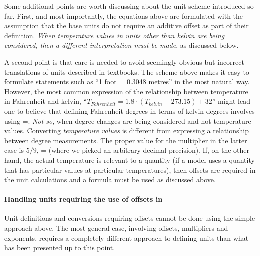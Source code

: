 Some additional points are worth discussing about the unit scheme
introduced so far.  First, and most importantly, the equations
above are formulated with the assumption that the base units do
not require an additive offset as part of their definition.
\emph{When temperature values in units other than kelvin are being
  considered, then a different interpretation must be made}, as
discussed below.

A second point is that care is needed to avoid seemingly-obvious
but incorrect translations of units described in textbooks.  The
scheme above makes it easy to formulate statements such as ``1
foot = 0.3048 metres'' in the most natural way.  However, the most
common expression of the relationship between temperature in
Fahrenheit and kelvin, ``$T_{Fahrenheit} = 1.8 \cdot (T_{kelvin} -
273.15) + 32$'' might lead one to believe that defining Fahrenheit
degrees in terms of kelvin degrees involves using
=.  \emph{Not so}, when degree changes
are being considered and not temperature values.  Converting
\emph{temperature values} is different from expressing a
relationship between degree measurements.  The proper value for
the multiplier in the latter case is $5/9$, \ie
{}= (where we picked an arbitrary
decimal precision).  If, on the other hand, the actual temperature
is relevant to a quantity (\eg if a model uses a quantity that has
particular values at particular temperatures), then offsets are
required in the unit calculations and a formula must be used as
discussed above.


\paragraph{Handling units requiring the use of offsets in \sbmltwotwo}

Unit definitions and conversions requiring offsets cannot be done
using the simple approach above.  The most general case, involving
offsets, multipliers and exponents, requires a completely
different approach to defining units than what has been presented
up to this point.

